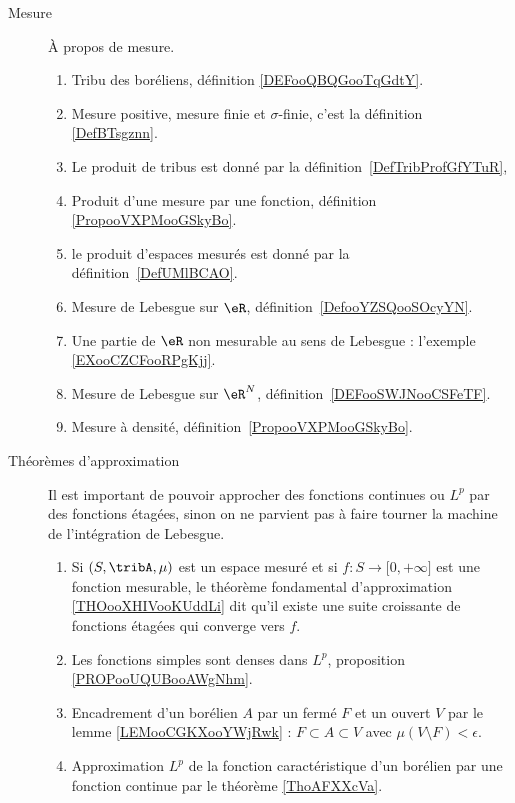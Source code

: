 

       \label{THEMEooKLVRooEqecQk}
\begin{description}
	\item[Mesure]
	      À propos de mesure.
	      \begin{enumerate}
		      \item
		            Tribu des boréliens, définition \ref{DEFooQBQGooTqGdtY}.
		      \item
		            Mesure positive, mesure finie et \( \sigma\)-finie, c'est la définition \ref{DefBTsgznn}.

		      \item Le produit de tribus est donné par la définition~\ref{DefTribProfGfYTuR},     %
		      \item
		            Produit d'une mesure par une fonction, définition \ref{PropooVXPMooGSkyBo}.
		      \item le produit d'espaces mesurés est donné par la définition~\ref{DefUMlBCAO}.     %
		      \item
		            Mesure de Lebesgue sur \( \eR\), définition~\ref{DefooYZSQooSOcyYN}.
		      \item
		            Une partie de \( \eR\) non mesurable au sens de Lebesgue : l'exemple \ref{EXooCZCFooRPgKjj}.
		      \item
		            Mesure de Lebesgue sur \( \eR^N\), définition~\ref{DEFooSWJNooCSFeTF}.
		      \item
		            Mesure à densité, définition~\ref{PropooVXPMooGSkyBo}.
	      \end{enumerate}
	\item[Théorèmes d'approximation]
	      Il est important de pouvoir approcher des fonctions continues ou \( L^p\) par des fonctions étagées, sinon on ne parvient pas à faire tourner la machine de l'intégration de Lebesgue.
	      \begin{enumerate}
		      \item
		            Si \( (S,\tribA, \mu)\) est un espace mesuré et si \( f\colon S\to \mathopen[ 0 , +\infty \mathclose]\) est une fonction mesurable, le théorème fondamental d'approximation \ref{THOooXHIVooKUddLi} dit qu'il existe une suite croissante de fonctions étagées qui converge vers \( f\).
		      \item
		            Les fonctions simples sont denses dans \( L^p\), proposition \ref{PROPooUQUBooAWgNhm}.
		      \item
		            Encadrement d'un borélien \( A\) par un fermé \( F\) et un ouvert \( V\) par le lemme \ref{LEMooCGKXooYWjRwk} : \( F\subset A\subset V\) avec \( \mu(V\setminus F)<\epsilon\).
		      \item
		            Approximation \( L^p\) de la fonction caractéristique d'un borélien par une fonction continue par le théorème \ref{ThoAFXXcVa}.
	      \end{enumerate}
\end{description}

